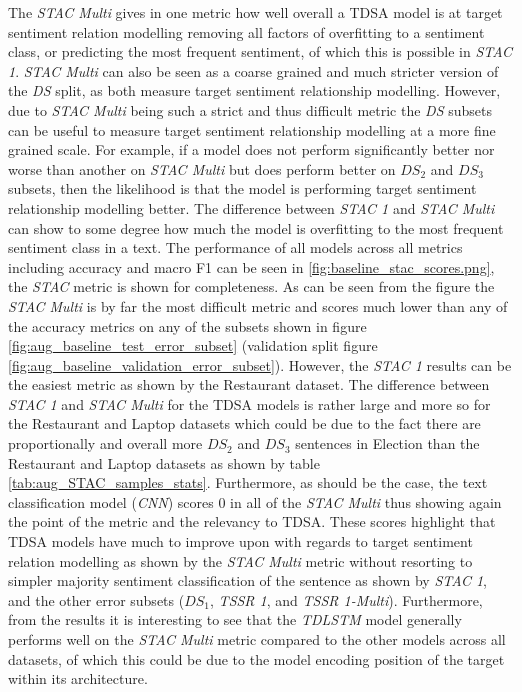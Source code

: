 The \textit{STAC Multi} gives in one metric how well overall a TDSA model is at target sentiment relation modelling removing all factors of overfitting to a sentiment class, or predicting the most frequent sentiment, of which this is possible in \textit{STAC 1}. \textit{STAC Multi} can also be seen as a coarse grained and much stricter version of the \textit{DS} split, as both measure target sentiment relationship modelling. However, due to \textit{STAC Multi} being such a strict and thus difficult metric the \textit{DS} subsets can be useful to measure target sentiment relationship modelling at a more fine grained scale. For example, if a model does not perform significantly better nor worse than another on \textit{STAC Multi} but does perform better on $DS_2$ and $DS_3$ subsets, then the likelihood is that the model is performing target sentiment relationship modelling better. The difference between \textit{STAC 1} and \textit{STAC Multi} can show to some degree how much the model is overfitting to the most frequent sentiment class in a text. The performance of all models across all metrics including accuracy and macro F1 can be seen in \ref{fig:baseline_stac_scores.png}, the \textit{STAC} metric is shown for completeness. As can be seen from the figure the \textit{STAC Multi} is by far the most difficult metric and scores much lower than any of the accuracy metrics on any of the subsets shown in figure \ref{fig:aug_baseline_test_error_subset} (validation split figure \ref{fig:aug_baseline_validation_error_subset}). However, the \textit{STAC 1} results can be the easiest metric as shown by the Restaurant dataset. The difference between \textit{STAC 1} and \textit{STAC Multi} for the TDSA models is rather large and more so for the Restaurant and Laptop datasets which could be due to the fact there are proportionally and overall more $DS_2$ and $DS_3$ sentences in Election than the Restaurant and Laptop datasets as shown by table \ref{tab:aug_STAC_samples_stats}. Furthermore, as should be the case, the text classification model (\textit{CNN}) scores $0$ in all of the \textit{STAC Multi} thus showing again the point of the metric and the relevancy to TDSA. These scores highlight that TDSA models have much to improve upon with regards to target sentiment relation modelling as shown by the \textit{STAC Multi} metric without resorting to simpler majority sentiment classification of the sentence as shown by \textit{STAC 1}, and the other error subsets ($DS_1$, \textit{TSSR 1}, and \textit{TSSR 1-Multi}). Furthermore, from the results it is interesting to see that the \textit{TDLSTM} model generally performs well on the \textit{STAC Multi} metric compared to the other models across all datasets, of which this could be due to the model encoding position of the target within its architecture. 

